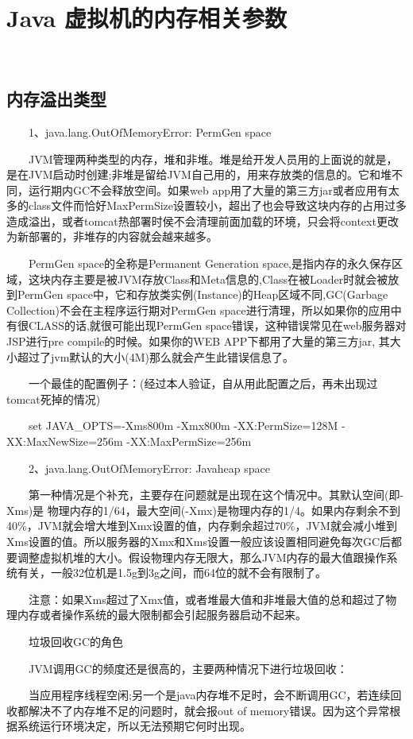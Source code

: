 \documentclass[a4paper, 11pt]{article}
\begin{document}
\section{Java 虚拟机的内存相关参数}
　\subsection{内存溢出类型} 
　　1、java.lang.OutOfMemoryError: PermGen space

　　JVM管理两种类型的内存，堆和非堆。堆是给开发人员用的上面说的就是，是在JVM启动时创建;非堆是留给JVM自己用的，用来存放类的信息的。它和堆不同，运行期内GC不会释放空间。如果web app用了大量的第三方jar或者应用有太多的class文件而恰好MaxPermSize设置较小，超出了也会导致这块内存的占用过多造成溢出，或者tomcat热部署时侯不会清理前面加载的环境，只会将context更改为新部署的，非堆存的内容就会越来越多。

　　PermGen space的全称是Permanent Generation space,是指内存的永久保存区域，这块内存主要是被JVM存放Class和Meta信息的,Class在被Loader时就会被放到PermGen space中，它和存放类实例(Instance)的Heap区域不同,GC(Garbage Collection)不会在主程序运行期对PermGen space进行清理，所以如果你的应用中有很CLASS的话,就很可能出现PermGen space错误，这种错误常见在web服务器对JSP进行pre compile的时候。如果你的WEB APP下都用了大量的第三方jar, 其大小超过了jvm默认的大小(4M)那么就会产生此错误信息了。

　　一个最佳的配置例子：(经过本人验证，自从用此配置之后，再未出现过tomcat死掉的情况)

　　set JAVA_OPTS=-Xms800m -Xmx800m -XX:PermSize=128M -XX:MaxNewSize=256m -XX:MaxPermSize=256m

　　2、java.lang.OutOfMemoryError: Javaheap space

　　第一种情况是个补充，主要存在问题就是出现在这个情况中。其默认空间(即-Xms)是
物理内存的1/64，最大空间(-Xmx)是物理内存的1/4。如果内存剩余不到40\%，JVM就会增大堆到Xmx设置的值，内存剩余超过70\%，JVM就会减小堆到Xms设置的值。所以服务器的Xmx和Xms设置一般应该设置相同避免每次GC后都要调整虚拟机堆的大小。假设物理内存无限大，那么JVM内存的最大值跟操作系统有关，一般32位机是1.5g到3g之间，而64位的就不会有限制了。

　　注意：如果Xms超过了Xmx值，或者堆最大值和非堆最大值的总和超过了物理内存或者操作系统的最大限制都会引起服务器启动不起来。

　　垃圾回收GC的角色

　　JVM调用GC的频度还是很高的，主要两种情况下进行垃圾回收：

　　当应用程序线程空闲;另一个是java内存堆不足时，会不断调用GC，若连续回收都解决不了内存堆不足的问题时，就会报out of memory错误。因为这个异常根据系统运行环境决定，所以无法预期它何时出现。
\end{document}
